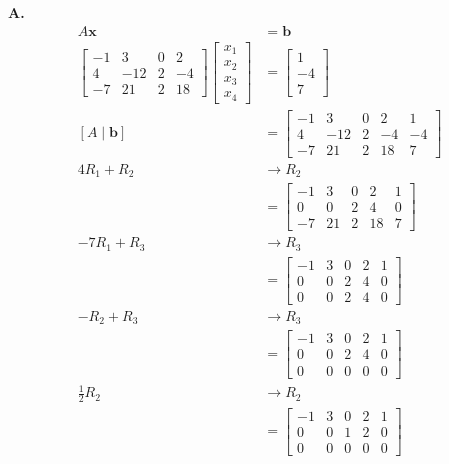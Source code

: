\documentclass[main.tex]{subfiles}
\begin{document}
\begin{enumerate}
\textbf{A.}
$$
\begin{aligned}
A\bm{x} &= \bm{b}\\
\left[\begin{array}{llll}
-1 & 3 & 0 & 2 \\
4 & -12 & 2 & -4 \\
-7 & 21 & 2 & 18
\end{array}\right] \left[\begin{array}{l}
x_1\\
x_2\\
x_3\\
x_4
\end{array}\right] & = \left[\begin{array}{l}
1 \\
-4\\
7
\end{array}\right]\\
\left[A\mid\bm{b}\right] &= \left[\begin{array}{llll|l}
-1 & 3 & 0 & 2 & 1 \\
4 & -12 & 2 & -4 & -4\\
-7 & 21 & 2 & 18 & 7
\end{array}\right]\\
4R_1 + R_2 &\rightarrow R_2\\
&= \left[\begin{array}{llll|l}
-1 & 3 & 0 & 2 & 1 \\
0 & 0 & 2 & 4 & 0\\
-7 & 21 & 2 & 18 & 7
\end{array}\right]\\
-7R_1 + R_3 &\rightarrow R_3\\
&= \left[\begin{array}{llll|l}
-1 & 3 & 0 & 2 & 1 \\
0 & 0 & 2 & 4 & 0\\
0 & 0 & 2 & 4 & 0
\end{array}\right]\\
-R_2 + R_3 &\rightarrow R_3\\
&= \left[\begin{array}{llll|l}
-1 & 3 & 0 & 2 & 1 \\
0 & 0 & 2 & 4 & 0\\
0 & 0 & 0 & 0 & 0
\end{array}\right]\\
\frac{1}{2}R_2 &\rightarrow R_2\\
&= \left[\begin{array}{llll|l}
-1 & 3 & 0 & 2 & 1 \\
0 & 0 & 1 & 2 & 0\\
0 & 0 & 0 & 0 & 0
\end{array}\right]\\
\end{aligned}
$$


\end{enumerate}
\end{document}
